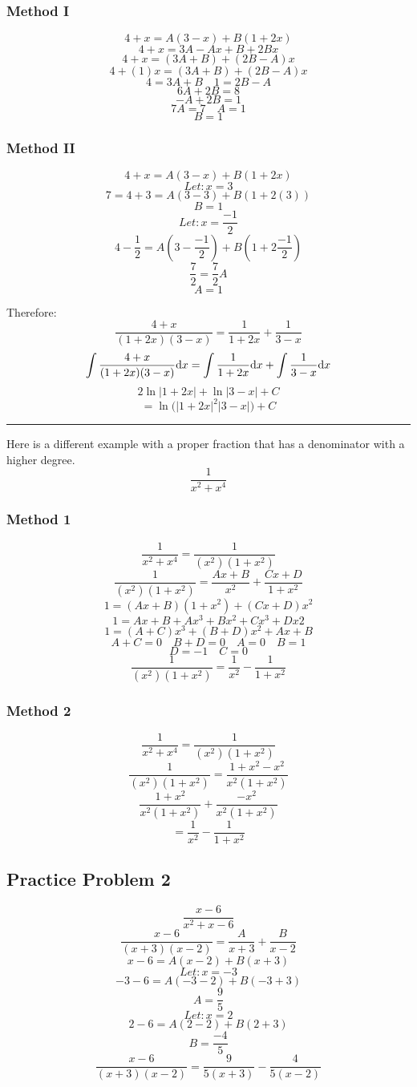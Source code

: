 \documentclass[letterpaper, 12pt]{math}
\begin{document}
\subsubsection*{Method I}
\[ 4+x = A(3-x)+B(1+2x) \]
\[ 4+x = 3A-Ax+B+2Bx \]
\[ 4+x = (3A+B)+(2B-A)x \]
\[ 4+(1)x = (3A+B)+(2B-A)x \]
\[ 4 = 3A+B \quad 1 = 2B-A \]
\[ 6A+2B = 8 \]
\[ -A+2B = 1 \]
\[ 7A = 7 \quad A = 1 \]
\[ B = 1 \]

\subsubsection*{Method II}
\[ 4+x = A(3-x)+B(1+2x) \]
\[ Let: x = 3 \]
\[ 7 = 4+3 = A(3-3)+B(1+2(3)) \]
\[ B = 1 \]
\[ Let: x = \frac{-1}{2} \]
\[ 4-\frac{1}{2} = A(3-\frac{-1}{2})+B(1+2\frac{-1}{2}) \]
\[ \frac{7}{2} = \frac{7}{2}A \]
\[ A = 1 \]

Therefore:
\[ \frac{4+x}{(1+2x)(3-x)} = \frac{1}{1+2x}+\frac{1}{3-x} \]
\[ \int{\frac{4+x}{(1+2x)(3-x)}\mathrm{d}{x}} =
   \int{\frac{1}{1+2x}\mathrm{d}{x}}+\int{\frac{1}{3-x}\mathrm{d}{x}} \]
\[ 2\ln|1+2x|+\ln|3-x|+C \]
\[ = \ln\bigg(|1+2x|^{2}|3-x|\bigg)+C \]

\noindent\rule{13.7cm}{0.4pt}

Here is a different example with a proper fraction that has a denominator
with a higher degree.
\[ \frac{1}{x^{2}+x^{4}} \]

\subsubsection*{Method 1}
\[ \frac{1}{x^{2}+x^{4}} = \frac{1}{(x^{2})(1+x^{2})} \]
\[ \frac{1}{(x^{2})(1+x^{2})} = \frac{Ax+B}{x^{2}}+\frac{Cx+D}{1+x^{2}} \]
\[ 1 = (Ax+B)(1+x^{2})+(Cx+D)x^{2} \]
\[ 1 = Ax+B+Ax^{3}+Bx^{2}+Cx^{3}+Dx{2} \]
\[ 1 = (A+C)x^{3}+(B+D)x^{2}+Ax+B \]
\[ A+C = 0 \quad B+D = 0 \quad A = 0 \quad B = 1 \]
\[ D = -1 \quad C = 0 \]
\[ \frac{1}{(x^{2})(1+x^{2})} = \frac{1}{x^{2}}-\frac{1}{1+x^{2}} \]

\subsubsection*{Method 2}
\[ \frac{1}{x^{2}+x^{4}} = \frac{1}{(x^{2})(1+x^{2})} \]
\[ \frac{1}{(x^{2})(1+x^{2})} = \frac{1+x^{2}-x^{2}}{x^{2}(1+x^{2})} \]
\[ \frac{1+x^{2}}{x^{2}(1+x^{2})}+\frac{-x^{2}}{x^{2}(1+x^{2})} \]
\[ = \frac{1}{x^{2}}-\frac{1}{1+x^{2}} \]

\subsection*{Practice Problem 2}
\[ \frac{x-6}{x^{2}+x-6} \]
\[ \frac{x-6}{(x+3)(x-2)} = \frac{A}{x+3}+\frac{B}{x-2} \]
\[ x-6 = A(x-2)+B(x+3) \]
\[ Let: x = -3 \]
\[ -3-6 = A(-3-2)+B(-3+3) \]
\[ A = \frac{9}{5} \]
\[ Let: x = 2 \]
\[ 2-6 = A(2-2)+B(2+3) \]
\[ B = \frac{-4}{5} \]
\[ \frac{x-6}{(x+3)(x-2)} = \frac{9}{5(x+3)}-\frac{4}{5(x-2)} \]
\end{document}

